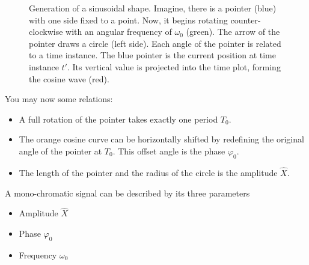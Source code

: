 \begin{refsection}
\begin{figure}[H]
	\caption[Generation of a sinusoidal shape]{Generation of a sinusoidal shape. Imagine, there is a pointer (blue) with one side fixed to a point. Now, it begins rotating counter-clockwise with an angular frequency of $\omega_0$ (green). The arrow of the pointer draws a circle (left side). Each angle of the pointer is related to a time instance. The blue pointer is the current position at time instance $t'$. Its vertical value is projected into the time plot, forming the cosine wave (red).}
	\label{fig:ch02:cos_creation}
\end{figure}

You may now some relations:
\begin{itemize}
	\item A full rotation of the pointer takes exactly one period $T_0$.
	\item The orange cosine curve can be horizontally shifted by redefining the original angle of the pointer at $T_0$. This offset angle is the phase $\varphi_0$.
	\item The length of the pointer and the radius of the circle is the amplitude $\hat{X}$.
\end{itemize}

A mono-chromatic signal can be described by its three parameters
\begin{itemize}
	\item Amplitude $\hat{X}$
	\item Phase $\varphi_0$
	\item Frequency $\omega_0$
\end{itemize}


\end{refsection}
